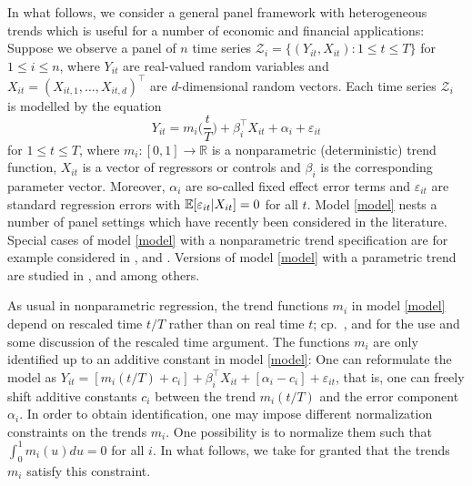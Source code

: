 \documentclass[a4paper,12pt]{article}
\begin{document}
In what follows, we consider a general panel framework with heterogeneous trends which is useful for a number of economic and financial applications: 
Suppose we observe a panel of $n$ time series $\mathcal{Z}_i = \{ (Y_{it},X_{it}): 1 \le t \le T \}$ for $1 \le i \le n$, where $Y_{it}$ are real-valued random variables and $X_{it} = (X_{it,1},\ldots,X_{it,d})^\top$ are $d$-dimensional random vectors. Each time series $\mathcal{Z}_i$ is modelled by the equation
\begin{equation}\label{model}
Y_{it} = m_i \Big( \frac{t}{T} \Big) + \beta_i^\top X_{it} + \alpha_i + \varepsilon_{it}
\end{equation}
for $1 \le t \le T$, where $m_i: [0,1] \rightarrow \mathbb{R}$ is a nonparametric (deterministic) trend function, $X_{it}$ is a vector of regressors or controls and $\beta_i$ is the corresponding parameter vector. Moreover, $\alpha_i$ are so-called fixed effect error terms and $\varepsilon_{it}$ are standard regression errors with $\mathbb{E}[\varepsilon_{it}|X_{it}] = 0$ for all $t$. Model \eqref{model} nests a number of panel settings which have recently been considered in the literature. Special cases of model \eqref{model} with a nonparametric trend specification are for example considered in \cite{Atak2011}, \cite{Zhang2012} and \cite{Hidalgo2014}. Versions of model \eqref{model} with a parametric trend are studied in \cite{Vogelsang2005}, \cite{Sun2011} and \cite{Xu2012} among others.


As usual in nonparametric regression, the trend functions $m_i$ in model \eqref{model} depend on rescaled time $t/T$ rather than on real time $t$; cp.\ \cite{Robinson1989}, \cite{Dahlhaus1997} and \cite{VogtLinton2014} for the use and some discussion of the rescaled time argument. The functions $m_i$ are only identified up to an additive constant in model \eqref{model}: One can reformulate the model as $Y_{it} = [m_i(t/T) + c_i] + \beta_i^\top X_{it} + [\alpha_i - c_i] + \varepsilon_{it}$, that is, one can freely shift additive constants $c_i$ between the trend $m_i(t/T)$ and the error component $\alpha_i$. In order to obtain identification, one may impose different normalization constraints on the trends $m_i$. One possibility is to normalize them such that $\int_0^1 m_i(u) du = 0$ for all $i$. In what follows, we take for granted that the trends $m_i$ satisfy this constraint. 
\end{document}
